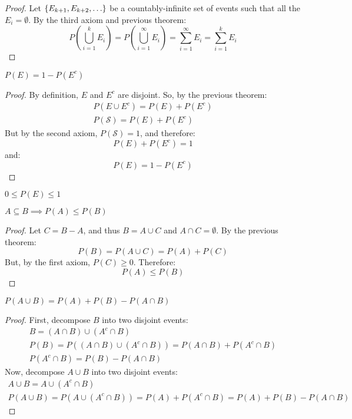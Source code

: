 \documentclass[letterpaper,12pt,fleqn]{article}
\renewcommand{\S}{\mathcal{S}}
\begin{document}
\begin{proof}
  Let \(\{E_{k+1},E_{k+2},\ldots\}\) be a countably-infinite set of events such that all the \(E_i=\emptyset\).  By the
  third axiom and previous theorem:
  \[P(\bigcup_{i=1}^kE_i)=P(\bigcup_{i=1}^{\infty}E_i)=\sum_{i=1}^{\infty}E_i=\sum_{i=1}^kE_i\]
\end{proof}

\begin{theorem}
\(P(E)=1-P(E^c)\)
\end{theorem}

\begin{proof}
  By definition, \(E\) and \(E^c\) are disjoint.  So, by the previous theorem:
  \begin{gather*}
    P(E\cup E^c)=P(E)+P(E^c) \\
    P(\S)=P(E)+P(E^c)
  \end{gather*}
  But by the second axiom, \(P(\S)=1\), and therefore:
  \[P(E)+P(E^c)=1\]
  and:
  \[P(E)=1-P(E^c)\]
\end{proof}

\begin{corollary}
  \(0\le P(E)\le1\)
\end{corollary}

\begin{theorem}
  \(A\subseteq B\implies P(A)\le P(B)\)
\end{theorem}

\begin{proof}
  Let \(C=B-A\), and thus \(B=A\cup C\) and \(A\cap C=\emptyset\).  By the previous theorem:
  \[P(B)=P(A\cup C)=P(A)+P(C)\]
  But, by the first axiom, \(P(C)\ge0\).  Therefore:
  \[P(A)\le P(B)\]
\end{proof}

\begin{theorem}[PIE]
  \(P(A\cup B)=P(A)+P(B)-P(A\cap B)\)
\end{theorem}

\begin{proof}
  First, decompose \(B\) into two disjoint events:
  \begin{gather*}
    B=(A\cap B)\cup(A^c\cap B) \\
    P(B)=P((A\cap B)\cup(A^c\cap B))=P(A\cap B)+P(A^c\cap B) \\
    P(A^c\cap B)=P(B)-P(A\cap B)
  \end{gather*}
  Now, decompose \(A\cup B\) into two disjoint events:
  \begin{gather*}
    A\cup B=A\cup(A^c\cap B) \\
    P(A\cup B)=P\left(A\cup(A^c\cap B)\right)=P(A)+P(A^c\cap B)=P(A)+P(B)-P(A\cap B)
  \end{gather*}
\end{proof}
\end{document}
